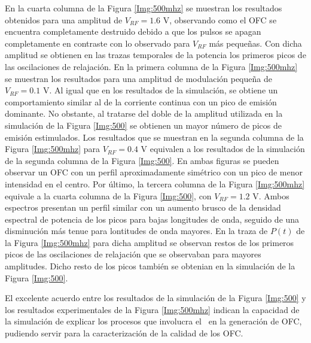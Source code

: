 			En la cuarta columna de la Figura \ref{Img:500mhz} se muestran los resultados obtenidos para una amplitud de $V_{RF} = 1.6$ V, observando como el OFC se encuentra completamente destruido debido a que los pulsos se apagan completamente en contraste con lo observado para $V_{RF}$ más pequeñas. Con dicha amplitud se obtienen en las trazas temporales de la potencia los primeros picos de las oscilaciones de relajaci\'on. En la primera columna de la Figura \ref{Img:500mhz} se muestran los resultados para una amplitud de modulación pequeña de $V_{RF} = 0.1$ V. Al igual que en los resultados de la simulación, se obtiene un comportamiento similar al de la corriente continua con un pico de emisi\'on dominante. No obstante, al tratarse del doble de la amplitud utilizada en la simulaci\'on de la Figura \ref{Img:500} se obtienen un mayor n\'umero de picos de emisión estimulados. Los resultados que se muestran en la segunda columna de la Figura \ref{Img:500mhz}  para $V_{RF} = 0.4$ V equivalen a los resultados de la simulación de la segunda columna de la Figura \ref{Img:500}. En ambas figuras se pueden observar un OFC con un perfil aproximadamente sim\'etrico con un pico de menor intensidad en el centro. Por \'ultimo, la tercera columna de la Figura \ref{Img:500mhz} equivale a la cuarta columna de la Figura \ref{Img:500}, con $V_{RF} = 1.2$ V. Ambos espectros presentan un perfil similar con un aumento brusco de la densidad espectral de potencia de los picos para bajas longitudes de onda, seguido de una disminuci\'on m\'as tenue para lontitudes de onda mayores. En la traza de $P(t)$ de la Figura \ref{Img:500mhz} para dicha amplitud se observan restos de los primeros picos de las oscilaciones de relajaci\'on que se observaban para mayores amplitudes. Dicho resto de los picos tambi\'en se obtenian en la simulaci\'on de la Figura \ref{Img:500}.

	El excelente acuerdo entre los resultados de la simulaci\'on de la Figura \ref{Img:500} y los resultados experimentales de la Figura \ref{Img:500mhz} indican la capacidad de la simulaci\'on de explicar los procesos que involucra el \gs\ en la generaci\'on de OFC, pudiendo servir para la caracterizaci\'on de la calidad de los OFC.
